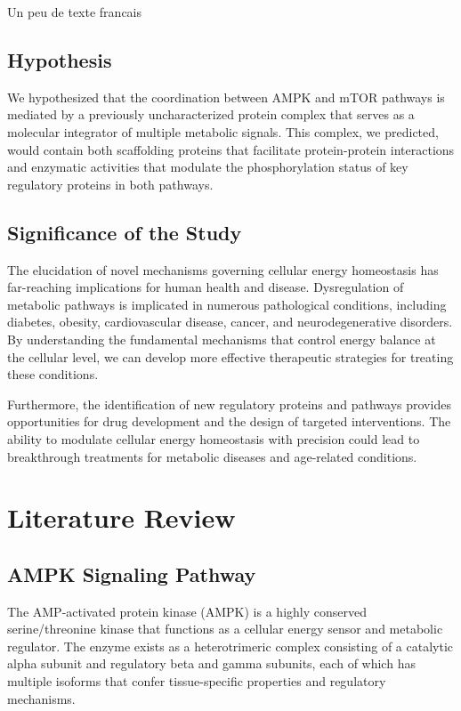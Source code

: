 \documentclass[11pt,a4paper]{article}
\begin{document}
Un peu de texte francais

\subsection{Hypothesis}

We hypothesized that the coordination between AMPK and mTOR pathways is mediated by a previously uncharacterized protein complex that serves as a molecular integrator of multiple metabolic signals. This complex, we predicted, would contain both scaffolding proteins that facilitate protein-protein interactions and enzymatic activities that modulate the phosphorylation status of key regulatory proteins in both pathways.

\subsection{Significance of the Study}

The elucidation of novel mechanisms governing cellular energy homeostasis has far-reaching implications for human health and disease. Dysregulation of metabolic pathways is implicated in numerous pathological conditions, including diabetes, obesity, cardiovascular disease, cancer, and neurodegenerative disorders. By understanding the fundamental mechanisms that control energy balance at the cellular level, we can develop more effective therapeutic strategies for treating these conditions.

Furthermore, the identification of new regulatory proteins and pathways provides opportunities for drug development and the design of targeted interventions. The ability to modulate cellular energy homeostasis with precision could lead to breakthrough treatments for metabolic diseases and age-related conditions.

\section{Literature Review}

\subsection{AMPK Signaling Pathway}

The AMP-activated protein kinase (AMPK) is a highly conserved serine/threonine kinase that functions as a cellular energy sensor and metabolic regulator. The enzyme exists as a heterotrimeric complex consisting of a catalytic alpha subunit and regulatory beta and gamma subunits, each of which has multiple isoforms that confer tissue-specific properties and regulatory mechanisms.
\end{document}
